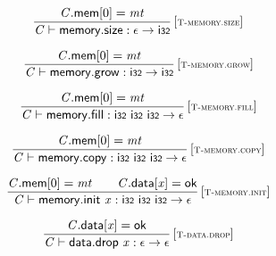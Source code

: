 \vspace{1ex}

$$
\begin{array}{@{}c@{}}\displaystyle
\frac{
{\mathit{C}}.\mathsf{mem}{}[0] = {\mathit{mt}}
}{
{\mathit{C}} \vdash \mathsf{memory.size} : \epsilon \rightarrow \mathsf{i{\scriptstyle32}}
} \, {[\textsc{\scriptsize T{-}memory.size}]}
\qquad
\end{array}
$$

$$
\begin{array}{@{}c@{}}\displaystyle
\frac{
{\mathit{C}}.\mathsf{mem}{}[0] = {\mathit{mt}}
}{
{\mathit{C}} \vdash \mathsf{memory.grow} : \mathsf{i{\scriptstyle32}} \rightarrow \mathsf{i{\scriptstyle32}}
} \, {[\textsc{\scriptsize T{-}memory.grow}]}
\qquad
\end{array}
$$

$$
\begin{array}{@{}c@{}}\displaystyle
\frac{
{\mathit{C}}.\mathsf{mem}{}[0] = {\mathit{mt}}
}{
{\mathit{C}} \vdash \mathsf{memory.fill} : \mathsf{i{\scriptstyle32}}~\mathsf{i{\scriptstyle32}}~\mathsf{i{\scriptstyle32}} \rightarrow \epsilon
} \, {[\textsc{\scriptsize T{-}memory.fill}]}
\qquad
\end{array}
$$

$$
\begin{array}{@{}c@{}}\displaystyle
\frac{
{\mathit{C}}.\mathsf{mem}{}[0] = {\mathit{mt}}
}{
{\mathit{C}} \vdash \mathsf{memory.copy} : \mathsf{i{\scriptstyle32}}~\mathsf{i{\scriptstyle32}}~\mathsf{i{\scriptstyle32}} \rightarrow \epsilon
} \, {[\textsc{\scriptsize T{-}memory.copy}]}
\qquad
\end{array}
$$

$$
\begin{array}{@{}c@{}}\displaystyle
\frac{
{\mathit{C}}.\mathsf{mem}{}[0] = {\mathit{mt}}
 \qquad
{\mathit{C}}.\mathsf{data}{}[{\mathit{x}}] = \mathsf{ok}
}{
{\mathit{C}} \vdash \mathsf{memory.init}~{\mathit{x}} : \mathsf{i{\scriptstyle32}}~\mathsf{i{\scriptstyle32}}~\mathsf{i{\scriptstyle32}} \rightarrow \epsilon
} \, {[\textsc{\scriptsize T{-}memory.init}]}
\qquad
\end{array}
$$

$$
\begin{array}{@{}c@{}}\displaystyle
\frac{
{\mathit{C}}.\mathsf{data}{}[{\mathit{x}}] = \mathsf{ok}
}{
{\mathit{C}} \vdash \mathsf{data.drop}~{\mathit{x}} : \epsilon \rightarrow \epsilon
} \, {[\textsc{\scriptsize T{-}data.drop}]}
\qquad
\end{array}
$$

